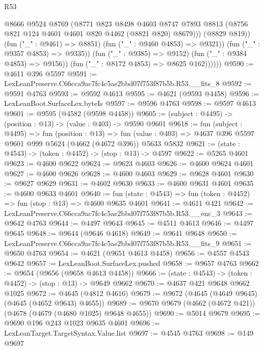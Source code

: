 \begin{lexlean}{R53}
\begin{coremodule}
                        @8666
                        @9524
                        @8769
                        (@8771
                          @823
                          @8498
                          @4603
                          @8747
                          @7893
                          @8813
                          (@8756 @821 @124 @4601 @4601 @820 @4462 (@8821 @820) @8679)))
                      (@8829 @819))
                    (fun ("_" : @9461) => @8851)
                    (fun ("_" : @9460 @4853) => @9321))
                  (fun ("_" : @9357 @4853) => @9335))
                (fun ("_" : @9385) => @9152)
                (fun ("_" : @9384 @4853) => @9156))
              (fun ("_" : @8172 @4853) => @8625 @162))))))
@9590 := @4611 @396 @5597
@9591 := LexLeanPreserve.C66cca9ac7fc4c5ae2bbd07f753f87b5b.R53.__fits_8
@9592 := @9591 @4763
@9593 := @9592 @4613
@9595 := @4621 (@9593 @4458)
@9596 := LexLeanBoot.SurfaceLex.byteIs
@9597 := @9596 @4763
@9598 := @9597 @4613
@9601 := @9595 (@4582 (@9598 @4458))
@9605 := (subject : @4495) -> (position : @13) -> (value : @403) -> @9590 @9601
@9618 := fun (subject : @4495) =>
  fun (position : @13) =>
  fun (value : @403) => @4637 @396 @5597 @9601 @999 @5624 (@4662 (@4672 @396)) @5633 @5832
@9621 := (state : @4543) -> (token : @4452) -> (stop : @13) -> @4597
@9622 := @5265 @4601
@9623 := @4600 @9622
@9624 := @9623 @4603
@9626 := @4600 @9624 @4601
@9627 := @4600 @9626
@9628 := @4600 @4603
@9629 := @9628 @4601
@9630 := @9627 @9629
@9631 := @4602 @9630
@9633 := @4600 @9631 @4601
@9635 := @4600 @9633 @4601
@9640 := fun (state : @4543) => fun (token : @4452) => fun (stop : @13) => @4600 @9635 @4601
@9641 := @4611 @421
@9642 := LexLeanPreserve.C66cca9ac7fc4c5ae2bbd07f753f87b5b.R53.__enc_3
@9643 := @9642 @4763
@9644 := @4497 @9643
@9645 := @4511 @4613
@9646 := @4497 @9645
@9648 := @9644 (@9646 @4618)
@9649 := @9641 @9648
@9650 := LexLeanPreserve.C66cca9ac7fc4c5ae2bbd07f753f87b5b.R53.__fits_9
@9651 := @9650 @4763
@9654 := @4621 (@9651 @4613 @4458)
@9656 := @4557 @4543 @9642
@9657 := LexLeanBoot.SurfaceLex.pushed
@9658 := @9657 @4763
@9662 := @9654 (@9656 (@9658 @4613 @4458))
@9666 := (state : @4543) -> (token : @4452) -> (stop : @13) -> @9649 @9662
@9670 := @4637 @421 @9648 @9662 @1025
@9672 := @4645 (@4812 @4616)
@9679 := @9672 (@4645 (@4649 @9645) (@4645 (@4652 @9643) @4655))
@9689 := @9670 @9679 (@4662 (@4672 @421)) (@4678 (@4679 (@4680 @1025) @9648 @4655))
@9690 := @5014 @9679
@9695 := @9690 @196 @243 @1023 @9635 @4601
@9696 := LexLeanTarget.TargetSyntax.Value.list
@9697 := @4545 @4763
@9698 := @149 @9697

\end{coremodule}
\end{lexlean}
